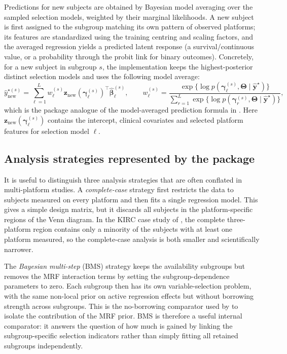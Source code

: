 \documentclass[article]{jss}
\begin{document}
Predictions for new subjects are obtained by Bayesian model
averaging over the sampled selection models, weighted by their marginal
likelihoods. A new subject is first assigned to the subgroup matching its own
pattern of observed platforms; its features are standardized using the training
centring and scaling factors, and the averaged regression yields a predicted
latent response (a survival/continuous value, or a probability through the
probit link for binary outcomes).
Concretely, for a new subject in subgroup $s$, the implementation keeps the
highest-posterior distinct selection models and uses the following
model average:
\[
  \widehat{y}^{\star(s)}_{\mathrm{new}}
  =
  \sum_{\ell=1}^{L}
  w_{\ell}^{(s)}
  \bm{z}_{\mathrm{new}}\!\left(\bm{\gamma}_{\ell}^{(s)}\right)^{\top}
  \widehat{\bm{\beta}}_{\ell}^{(s)}, \qquad
  w_{\ell}^{(s)}
  =
  \frac{\exp\{\log p(\bm{\gamma}_{\ell}^{(s)},\bm{\Theta}\mid
  \widehat{\bm{y}}^{\star})\}}
  {\sum_{r=1}^{L}\exp\{\log p(\bm{\gamma}_{r}^{(s)},\bm{\Theta}\mid
  \widehat{\bm{y}}^{\star})\}},
\]
which is the package analogue of the model-averaged prediction formula in
\citet{chekouo2017}.  Here $\bm{z}_{\mathrm{new}}(\bm{\gamma}_{\ell}^{(s)})$
contains the intercept, clinical covariates and selected platform features for
selection model $\ell$.

\subsection{Analysis strategies represented by the package}\label{sec:strategies}

It is useful to distinguish three analysis strategies that are often conflated
in multi-platform studies.  A \emph{complete-case} strategy first restricts the
data to subjects measured on every platform and then fits a single regression
model.  This gives a simple design matrix, but it discards all subjects in the
platform-specific regions of the Venn diagram.  In the KIRC case study of
\citet{chekouo2017}, the complete three-platform region contains only a
minority of the subjects with at least one platform measured, so the
complete-case analysis is both smaller and scientifically narrower.

The \emph{Bayesian multi-step} (BMS) strategy keeps the availability subgroups
but removes the MRF interaction terms by setting the subgroup-dependence
parameters to zero.  Each subgroup then has its own variable-selection problem,
with the same non-local prior on active regression effects but without borrowing
strength across subgroups.  This is the no-borrowing comparator used by
\citet{chekouo2017} to isolate the contribution of the MRF prior.  BMS is
therefore a useful internal comparator: it answers the question of how much is
gained by linking the subgroup-specific selection indicators rather than simply
fitting all retained subgroups independently.
\end{document}
